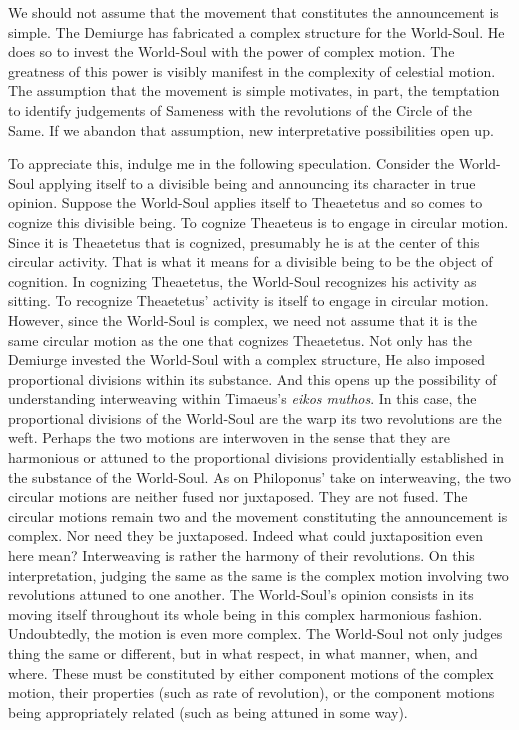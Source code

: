 We should not assume that the movement that constitutes the announcement is simple. The Demiurge has fabricated a complex structure for the World-Soul. He does so to invest the World-Soul with the power of complex motion. The greatness of this power is visibly manifest in the complexity of celestial motion. The assumption that the movement is simple motivates, in part, the temptation to identify judgements of Sameness with the revolutions of the Circle of the Same. If we abandon that assumption, new interpretative possibilities open up.

To appreciate this, indulge me in the following speculation. Consider the World-Soul applying itself to a divisible being and announcing its character in true opinion. Suppose the World-Soul applies itself to Theaetetus and so comes to cognize this divisible being. To cognize Theaeteus is to engage in circular motion. Since it is Theaetetus that is cognized, presumably he is at the center of this circular activity. That is what it means for a divisible being to be the object of cognition. In cognizing Theaetetus, the World-Soul recognizes his activity as sitting. To recognize Theaetetus' activity is itself to engage in circular motion. However, since the World-Soul is complex, we need not assume that it is the same circular motion as the one that cognizes Theaetetus. Not only has the Demiurge invested the World-Soul with a complex structure, He also imposed proportional divisions within its substance. And this opens up the possibility of understanding interweaving within Timaeus's \emph{eikos muthos}. In this case, the proportional divisions of the World-Soul are the warp its two revolutions are the weft. Perhaps the two motions are interwoven in the sense that they are harmonious or attuned to the proportional divisions providentially established in the substance of the World-Soul. As on Philoponus' take on interweaving, the two circular motions are neither fused nor juxtaposed. They are not fused. The circular motions remain two and the movement constituting the announcement is complex. Nor need they be juxtaposed. Indeed what could juxtaposition even here mean? Interweaving is rather the harmony of their revolutions. On this interpretation, judging the same as the same is the complex motion involving two revolutions attuned to one another. The World-Soul's opinion consists in its moving itself throughout its whole being in this complex harmonious fashion. Undoubtedly, the motion is even more complex. The World-Soul not only judges thing the same or different, but in what respect, in what manner, when, and where. These must be constituted by either component motions of the complex motion, their properties (such as rate of revolution), or the component motions being appropriately related (such as being attuned in some way).

